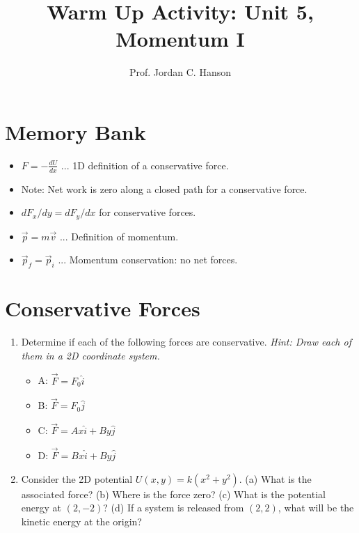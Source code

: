 \documentclass{article}
\begin{document}
\twocolumn

\title{Warm Up Activity: Unit 5, Momentum I}
\author{Prof. Jordan C. Hanson}

\maketitle

\section{Memory Bank}

\begin{itemize}
\item $F = -\frac{dU}{dx}$ ... 1D definition of a conservative force.
\item Note: Net work is zero along a closed path for a conservative force.
\item $dF_x/dy = dF_y/dx$ for conservative forces.
\item $\vec{p} = m \vec{v}$ ... Definition of momentum.
\item $\vec{p}_f = \vec{p}_i$ ... Momentum conservation: no net forces.
\end{itemize}

\section{Conservative Forces}

\begin{enumerate}
\item Determine if each of the following forces are conservative.  \textit{Hint: Draw each of them in a 2D coordinate system.}
\begin{itemize}
\item A: $\vec{F} = F_0 \hat{i}$
\item B: $\vec{F} = F_0 \hat{j}$
\item C: $\vec{F} = A x \hat{i} + B y \hat{j}$
\item D: $\vec{F} = B x \hat{i} + B y \hat{j}$
\end{itemize}
\item Consider the 2D potential $U(x,y) = k(x^2 + y^2)$.  (a) What is the associated force? (b) Where is the force zero? (c) What is the potential energy at $(2,-2)$?  (d) If a system is released from $(2,2)$, what will be the kinetic energy at the origin? \\ \vspace{2cm}
\end{enumerate}
\end{document}
